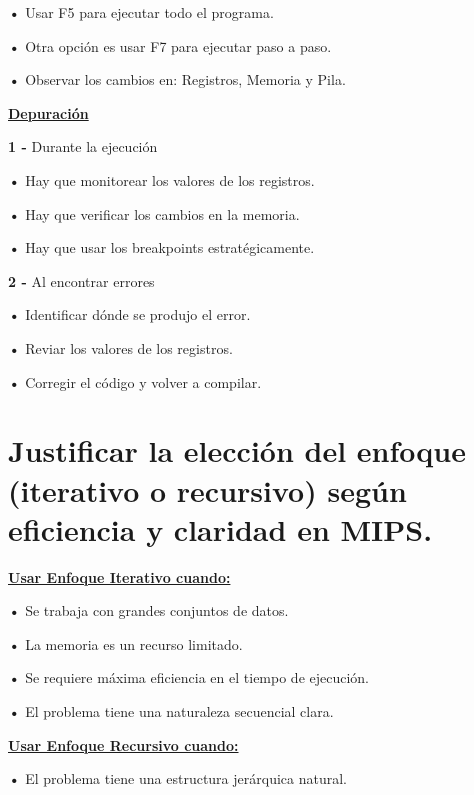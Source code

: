 \documentclass{article}
\begin{document}
\textbf{    •} { Usar F5 para ejecutar todo el programa.}

\textbf{    •} { Otra opción es usar F7 para ejecutar paso a paso.}

\textbf{    •} { Observar los cambios en: Registros, Memoria y Pila.}

\quad

\textbf{\underline{Depuración}}

\quad

\textbf{1 -  } { Durante la ejecución}

\quad

\textbf{    •} { Hay que monitorear los valores de los registros.}

\textbf{    •} { Hay que verificar los cambios en la memoria.}

\textbf{    •} { Hay que usar los breakpoints estratégicamente.}

\quad

\textbf{2 -  } { Al encontrar errores}

\quad

\textbf{    •} { Identificar dónde se produjo el error.}

\textbf{    •} { Reviar los valores de los registros.}

\textbf{    •} { Corregir el código y volver a compilar.}

\quad
\newpage


\section{Justificar la elección del enfoque (iterativo o recursivo) según eficiencia y claridad en MIPS.}


\quad

\textbf{\underline{Usar Enfoque Iterativo cuando:}}

\quad

\textbf{    •} { Se trabaja con grandes conjuntos de datos.}

\textbf{    •} { La memoria es un recurso limitado.}

\textbf{    •} { Se requiere máxima eficiencia en el tiempo de ejecución.}

\textbf{    •} { El problema tiene una naturaleza secuencial clara.}

\quad

\textbf{\underline{Usar Enfoque Recursivo cuando:}}


\quad

\textbf{    •} { El problema tiene una estructura jerárquica natural.}
\end{document}

